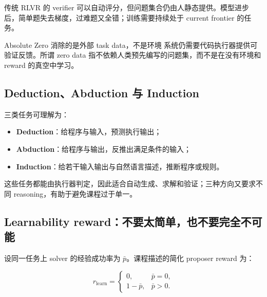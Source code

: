 \documentclass[a4paper]{article}
\begin{document}
传统 RLVR 的 verifier 可以自动评分，但问题集合仍由人静态提供。模型进步后，简单题失去梯度，过难题又全错；训练需要持续处于 current frontier 的任务。



\begin{importantbox}{Absolute Zero 消除的是外部 task data，不是环境}
系统仍需要代码执行器提供可验证反馈。所谓 zero data 指不依赖人类预先编写的问题集，而不是在没有环境和 reward 的真空中学习。
\end{importantbox}

\subsection{Deduction、Abduction 与 Induction}


三类任务可理解为：

\begin{itemize}
    \item \textbf{Deduction}：给程序与输入，预测执行输出；
    \item \textbf{Abduction}：给程序与输出，反推出满足条件的输入；
    \item \textbf{Induction}：给若干输入输出与自然语言描述，推断程序或规则。
\end{itemize}

这些任务都能由执行器判定，因此适合自动生成、求解和验证；三种方向又要求不同 reasoning，有助于避免课程过于单一。

\subsection{Learnability reward：不要太简单，也不要完全不可能}

设同一任务上 solver 的经验成功率为 $\bar p$。课程描述的简化 proposer reward 为：

$$
r_{\mathrm{learn}}=
\begin{cases}
0, & \bar p=0,\\
1-\bar p, & \bar p>0.
\end{cases}
$$
\end{document}
